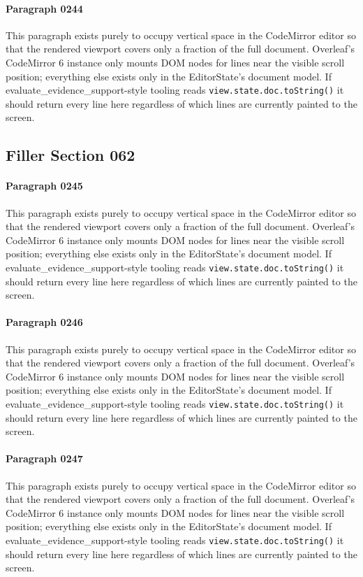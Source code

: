 \documentclass{article}
\begin{document}
\paragraph{Paragraph 0244}
This paragraph exists purely to occupy vertical space in the CodeMirror editor so that the rendered viewport covers only a fraction of the full document. Overleaf's CodeMirror 6 instance only mounts DOM nodes for lines near the visible scroll position; everything else exists only in the EditorState's document model. If evaluate\_evidence\_support-style tooling reads \texttt{view.state.doc.toString()} it should return every line here regardless of which lines are currently painted to the screen.

\subsection{Filler Section 062}
\paragraph{Paragraph 0245}
This paragraph exists purely to occupy vertical space in the CodeMirror editor so that the rendered viewport covers only a fraction of the full document. Overleaf's CodeMirror 6 instance only mounts DOM nodes for lines near the visible scroll position; everything else exists only in the EditorState's document model. If evaluate\_evidence\_support-style tooling reads \texttt{view.state.doc.toString()} it should return every line here regardless of which lines are currently painted to the screen.

\paragraph{Paragraph 0246}
This paragraph exists purely to occupy vertical space in the CodeMirror editor so that the rendered viewport covers only a fraction of the full document. Overleaf's CodeMirror 6 instance only mounts DOM nodes for lines near the visible scroll position; everything else exists only in the EditorState's document model. If evaluate\_evidence\_support-style tooling reads \texttt{view.state.doc.toString()} it should return every line here regardless of which lines are currently painted to the screen.

\paragraph{Paragraph 0247}
This paragraph exists purely to occupy vertical space in the CodeMirror editor so that the rendered viewport covers only a fraction of the full document. Overleaf's CodeMirror 6 instance only mounts DOM nodes for lines near the visible scroll position; everything else exists only in the EditorState's document model. If evaluate\_evidence\_support-style tooling reads \texttt{view.state.doc.toString()} it should return every line here regardless of which lines are currently painted to the screen.
\end{document}
